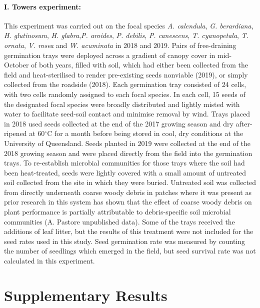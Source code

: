 \documentclass[a4,12pt]{article}
\begin{document}
        \paragraph{I. Towers experiment: }
        This experiment was carried out on the focal species \textit{A. calendula}, \textit{G. berardiana}, \textit{H. glutinosum}, \textit{H. glabra},\textit{P. aroides}, \textit{P. debilis}, \textit{P. canescens}, \textit{T. cyanopetala}, \textit{T. ornata}, \textit{V. rosea} and \textit{W. acuminata} in 2018 and 2019. Pairs of free-draining germination trays were deployed across a gradient of canopy cover in mid-October of both years, filled with soil, which had either been collected from the field and heat-sterilised to render pre-existing seeds nonviable (2019), or simply collected from the roadside (2018). Each germination tray consisted of 24 cells, with two cells randomly assigned to each focal species. In each cell, 15 seeds of the designated focal species were broadly distributed and lightly misted with water to facilitate seed-soil contact and minimise removal by wind. Trays placed in 2018 used seeds collected at the end of the 2017 growing season and dry after-ripened at 60$^{\circ}$C for a month before being stored in cool, dry conditions at the University of Queensland. Seeds planted in 2019 were collected at the end of the 2018 growing season and were placed directly from the field into the germination trays. To re-establish microbial communities for those trays where the soil had been heat-treated, seeds were lightly covered with a small amount of untreated soil collected from the site in which they were buried. Untreated soil was collected from directly underneath coarse woody debris in patches where it was present as prior research in this system has shown that the effect of coarse woody debris on plant performance is partially attributable to debris-specific soil microbial communities (A. Pastore unpublished data). Some of the trays received the additions of leaf litter, but the results of this treatment were not included for the seed rates used in this study. Seed germination rate was measured by counting the number of seedlings which emerged in the field, but seed survival rate was not calculated in this experiment.






\section{Supplementary Results}
\end{document}
